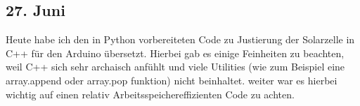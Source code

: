 \subsection{27. Juni}
Heute habe ich den in Python vorbereiteten Code zu Justierung der Solarzelle in C++ für den Arduino übersetzt. Hierbei gab es einige Feinheiten zu beachten, weil C++ sich sehr archaisch anfühlt und viele Utilities (wie zum Beispiel eine array.append oder array.pop funktion) nicht beinhaltet. weiter war es hierbei wichtig auf einen relativ Arbeitsspeichereffizienten Code zu achten.